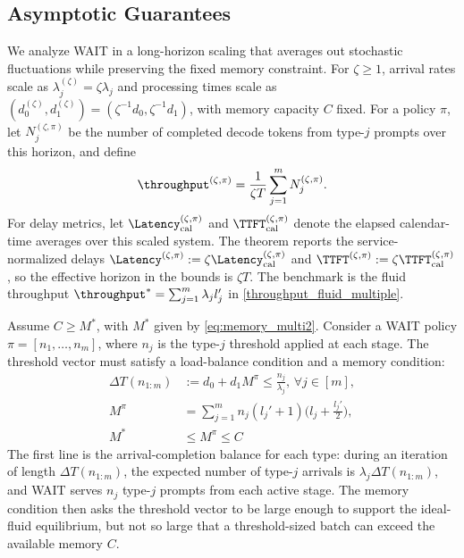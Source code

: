 \subsection{Asymptotic Guarantees}
\label{subsec:asymptotic_analysis}
\label{subsec:main_theorem}
We analyze WAIT in a long-horizon scaling that averages out stochastic fluctuations while preserving the fixed memory constraint. For \(\zeta\ge 1\), arrival rates scale as \(\lambda_j^{(\zeta)}=\zeta\lambda_j\) and processing times scale as \((d_0^{(\zeta)},d_1^{(\zeta)})=(\zeta^{-1}d_0,\zeta^{-1}d_1)\), with memory capacity \(C\) fixed. For a policy \(\pi\), let \(N_j^{(\zeta,\pi)}\) be the number of completed decode tokens from type-\(j\) prompts over this horizon, and define
\[
\throughput^{(\zeta, \pi)} = \frac{1}{\zeta T} \sum_{j=1}^m N_j^{(\zeta, \pi)}.
\]
For delay metrics, let \(\Latency_{\rm cal}^{(\zeta,\pi)}\) and \(\TTFT_{\rm cal}^{(\zeta,\pi)}\) denote the elapsed calendar-time averages over this scaled system. The theorem reports the service-normalized delays \(\Latency^{(\zeta,\pi)}:=\zeta\Latency_{\rm cal}^{(\zeta,\pi)}\) and \(\TTFT^{(\zeta,\pi)}:=\zeta\TTFT_{\rm cal}^{(\zeta,\pi)}\), so the effective horizon in the bounds is \(\zeta T\). The benchmark is the fluid throughput \(\throughput^*=\sum_{j=1}^m \lambda_j l_j'\) in \eqref{throughput_fluid_multiple}.

Assume \(C \ge M^*\), with \(M^*\) given by \eqref{eq:memory_multi2}. Consider a WAIT policy \(\pi=[n_1,\dots,n_m]\), where \(n_j\) is the type-\(j\) threshold applied at each stage. The threshold vector must satisfy a load-balance condition and a memory condition:
\begin{equation}
\label{eq:wait_thresholds}
\begin{aligned}
\Delta T(n_{1:m}) &:= d_0 + d_1 M^{\pi} \leq \tfrac{n_j}{\lambda_j},\, \forall j\in[m],\\
 M^{\pi} &= \sum_{j=1}^m n_j (l_j' + 1) \big(l_j + \tfrac{l_j'}{2}\big),\\
 M^* &\leq M^\pi \leq C
\end{aligned}
\end{equation}
The first line is the arrival-completion balance for each type: during an iteration of length \(\Delta T(n_{1:m})\), the expected number of type-\(j\) arrivals is \(\lambda_j\Delta T(n_{1:m})\), and WAIT serves \(n_j\) type-\(j\) prompts from each active stage. The memory condition then asks the threshold vector to be large enough to support the ideal-fluid equilibrium, but not so large that a threshold-sized batch can exceed the available memory \(C\).

